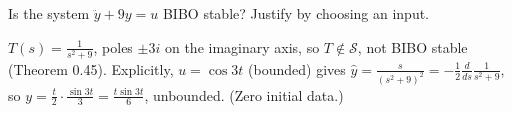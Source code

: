 \begin{qbox}[title={Q4.3 (BIBO and resonance)}]
Is the system $\ddot y+9y=u$ BIBO stable? Justify by choosing an input.
\end{qbox}
\begin{solbox}
$T(s)=\frac1{s^2+9}$, poles $\pm3i$ on the imaginary axis, so $T\notin\mathcal S$, not BIBO stable (Theorem 0.45). Explicitly, $u=\cos3t$ (bounded) gives
$\hat y=\frac{s}{(s^2+9)^2}=-\frac12\frac{d}{ds}\frac{1}{s^2+9}$, so $y=\frac{t}{2}\cdot\frac{\sin3t}{3}=\frac{t\sin3t}{6}$, unbounded. (Zero initial data.)
\end{solbox}
\newpage
